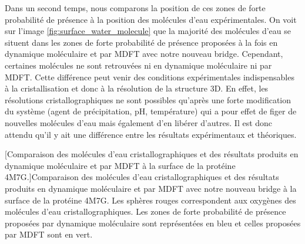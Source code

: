 Dans un second temps, nous comparons la position de ces zones de forte probabilité de présence à la position des molécules d'eau expérimentales. On voit sur l'image \ref{fig:surface_water_molecule} que la majorité des molécules d'eau se situent dans les zones de forte probabilité de présence proposées à la fois en dynamique moléculaire et par MDFT avec notre nouveau bridge. Cependant, certaines molécules ne sont retrouvées ni en dynamique moléculaire ni par MDFT. Cette différence peut venir des conditions expérimentales indispensables à la cristallisation et donc à la résolution de la structure 3D. En effet, les résolutions cristallographiques ne sont possibles qu'après une forte modification du système (agent de précipitation, pH, température) qui a pour effet de figer de nouvelles molécules d'eau mais également d'en libérer d'autres. Il est donc attendu qu'il y ait une différence entre les résultats expérimentaux et théoriques.




\begin{center}
    \captionsetup{type=figure}
	[Comparaison des molécules d'eau cristallographiques et des résultats produits en dynamique moléculaire et par MDFT à la surface de la protéine 4M7G.]{Comparaison des molécules d'eau cristallographiques et des résultats produits en dynamique moléculaire et par MDFT avec notre nouveau bridge à la surface de la protéine 4M7G. Les sphères rouges correspondent aux oxygènes des molécules d'eau cristallographiques. Les zones de forte probabilité de présence proposées par dynamique moléculaire sont représentées en bleu et celles proposées par MDFT sont en vert.}
      \label{fig:surface_water_molecule}
\end{center}



